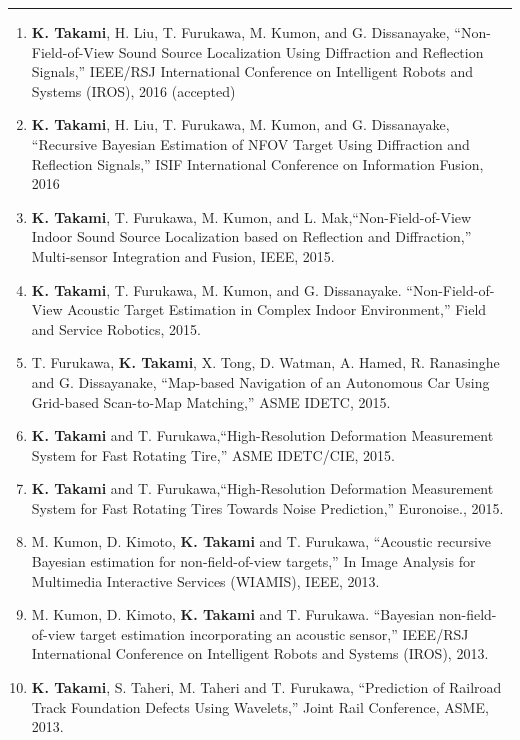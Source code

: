 \documentclass[11pt,letterpaper]{article}
\newcommand{\sect}[1]{\vspace{8mm}{\centering {\bf \large \scshape \uppercase{#1}} \par}  \vskip 2mm   {\color{blue} \hrule height 1pt}\vspace{2mm}}
\begin{document}
\sect{Conference papers and workshop}
\begin{enumerate}
	\item {\bf K. Takami}, H. Liu, T. Furukawa, M. Kumon, and G. Dissanayake, ``Non-Field-of-View Sound Source Localization
	Using Diffraction and Reflection Signals,'' IEEE/RSJ International
	Conference on Intelligent Robots and Systems (IROS), 2016 (accepted)
  \item {\bf K. Takami}, H. Liu, T. Furukawa, M. Kumon, and G. Dissanayake, ``Recursive Bayesian Estimation of NFOV Target Using Diffraction and Reflection Signals,'' ISIF International Conference on Information Fusion, 2016
  \item  {\bf K. Takami}, T. Furukawa, M. Kumon, and L. Mak,``Non-Field-of-View Indoor Sound Source Localization based on Reflection and Diffraction,'' Multi-sensor Integration and Fusion, IEEE, 2015.

  \item {\bf K. Takami}, T. Furukawa, M. Kumon, and G. Dissanayake. ``Non-Field-of-View Acoustic Target Estimation in Complex Indoor Environment,'' Field and Service Robotics, 2015.

  \item  T. Furukawa, {\bf K. Takami}, X. Tong, D. Watman, A. Hamed, R. Ranasinghe and G. Dissayanake, ``Map-based Navigation of an Autonomous Car Using Grid-based Scan-to-Map Matching,'' ASME IDETC, 2015.

  \item  {\bf K. Takami} and T. Furukawa,``High-Resolution Deformation Measurement System for Fast Rotating Tire,'' ASME IDETC/CIE, 2015.


  \item  {\bf K. Takami} and T. Furukawa,``High-Resolution Deformation Measurement System for Fast Rotating Tires Towards Noise Prediction,'' Euronoise., 2015.

  \item M. Kumon, D. Kimoto, {\bf K. Takami} and T. Furukawa, ``Acoustic recursive Bayesian estimation for non-field-of-view targets,'' In Image Analysis for Multimedia Interactive Services (WIAMIS), IEEE, 2013.

  \item M. Kumon, D. Kimoto, {\bf K. Takami} and T. Furukawa. ``Bayesian non-field-of-view target estimation incorporating an acoustic sensor,'' IEEE/RSJ International Conference on Intelligent Robots and Systems  (IROS), 2013.

  \item {\bf K. Takami}, S. Taheri, M. Taheri and T. Furukawa, ``Prediction of Railroad Track Foundation Defects Using Wavelets,'' Joint Rail Conference, ASME, 2013.
\end{enumerate}
\end{document}
